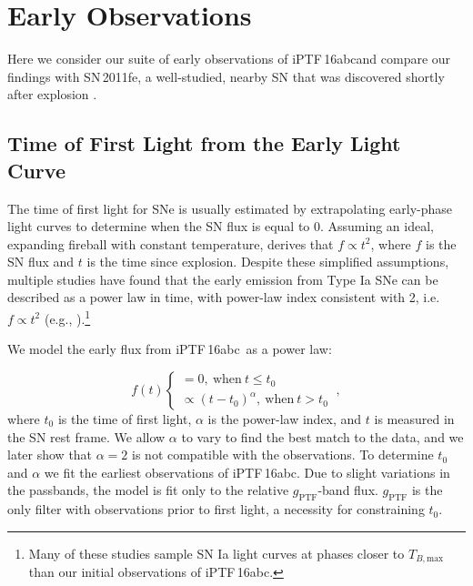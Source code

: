 \documentclass[twocolumn]{aastex61}
\newcommand{\abc}{iPTF\,16abc}
\begin{document}
\section{Early Observations}
\label{sec:first_light}

Here we consider our suite of early observations of \abc and compare our
findings with SN\,2011fe, a well-studied, nearby SN that was discovered
shortly after explosion
\citep{2011Natur.480..344N,2012ApJ...744L..17B,2014ApJ...784...85P}.

\subsection{Time of First Light from the Early Light Curve}
\label{sec:lc_fit}

The time of first light for SNe is usually estimated by extrapolating
early-phase light curves to determine when the SN flux is equal to 0.
Assuming an ideal, expanding fireball with constant temperature,
\citet{1982ApJ...253..785A} derives that $f \propto t^2$, where $f$ is the
SN flux and $t$ is the time since explosion. Despite these simplified
assumptions, multiple studies have found that the early emission from Type
Ia SNe can be described as a power law in time, with power-law index
consistent with 2, i.e. $f \propto t^2$ (e.g., \citealt{2006AJ....132.1707C,
2010ApJ...712..350H, 2011MNRAS.416.2607G}).\footnote{Many of these studies
sample SN Ia light curves at phases closer to $T_{B,\mathrm{max}}$ than our
initial observations of \abc.}

We model the early flux from \abc\ as a power law:

\begin{equation}
  \label{eq:broken_power_law}
  f(t) \left\{
    \begin{array}{ll}
      = 0,\ \textrm{when}\ t \le t_0 \\
      \propto (t-t_0)^{\alpha},\ \textrm{when}\ t>t_0
    \end{array}
  \right.\ ,
\end{equation}
% 
where $t_0$ is the time of first light, $\alpha$ is the power-law index, and
$t$ is measured in the SN rest frame. We allow $\alpha$ to vary to find the
best match to the data, and we later show that $\alpha = 2$ is not
compatible with the observations. To determine $t_0$ and $\alpha$ we fit the
earliest observations of \abc. Due to slight variations in the passbands,
the model is fit only to the relative $g_\mathrm{PTF}$-band flux.
$g_\mathrm{PTF}$ is the only filter with observations prior to first light,
a necessity for constraining $t_0$.
\end{document}

